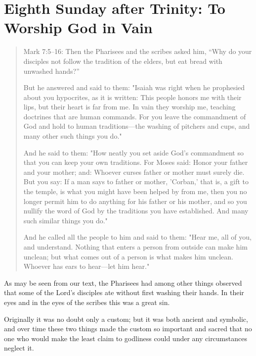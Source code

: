 

\section{Eighth Sunday after Trinity: To Worship God in Vain}


\begin{quote}

Mark 7:5–16: Then the Pharisees and the scribes asked him, “Why do your disciples not follow the tradition of the elders, but eat bread with unwashed hands?”

But he answered and said to them: "Isaiah was right when he prophesied about you hypocrites, as it is written: This people honors me with their lips, but their heart is far from me. In vain they worship me, teaching doctrines that are human commands. For you leave the commandment of God and hold to human traditions—the washing of pitchers and cups, and many other such things you do."

And he said to them: "How neatly you set aside God’s commandment so that you can keep your own traditions. For Moses said: Honor your father and your mother; and: Whoever curses father or mother must surely die. But you say: If a man says to father or mother, 'Corban,' that is, a gift to the temple, is what you might have been helped by from me, then you no longer permit him to do anything for his father or his mother, and so you nullify the word of God by the traditions you have established. And many such similar things you do."

And he called all the people to him and said to them: "Hear me, all of you, and understand. Nothing that enters a person from outside can make him unclean; but what comes out of a person is what makes him unclean. Whoever has ears to hear—let him hear."

\end{quote}

\bigskip



As may be seen from our text, the Pharisees had among other things observed that some of the Lord's disciples ate without first washing their hands. In their eyes and in the eyes of the scribes this was a great sin.

Originally it was no doubt only a custom; but it was both ancient and symbolic, and over time these two things made the custom so important and sacred that no one who would make the least claim to godliness could under any circumstances neglect it.

